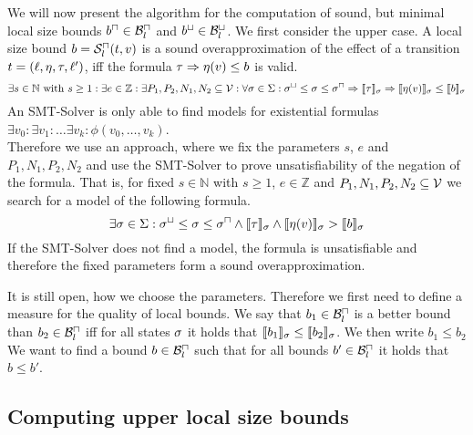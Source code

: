 We will now present the algorithm for the computation of sound, but minimal local size bounds $b^\sqcap \in \mathcal{B}^\sqcap_l$ and $b^\sqcup \in \mathcal{B}^\sqcup_l$.
We first consider the upper case.
A local size bound $b = {\mathcal{S}^\sqcap_l}(t,v)$ is a sound overapproximation of the effect of a transition $t = (\ell,\eta,\tau,\ell')$, iff the formula $\tau \Rightarrow \eta(v) \leq b$ is valid.
\[ \exists s \in \mathbb{N} \text{ with } s \geq 1:
\exists e \in \mathbb{Z}:
\exists P_1, P_2, N_1, N_2 \subseteq \mathcal{V}:
\forall \sigma \in \Sigma:
{\sigma^\sqcup} \leq \sigma \leq {\sigma^\sqcap} \Rightarrow
\llbracket \tau \rrbracket_{\sigma} \Rightarrow \llbracket \eta(v) \rrbracket_{\sigma} \leq \llbracket b \rrbracket_{\sigma} \]
An SMT-Solver is only able to find models for existential formulas $\exists v_0: \exists v_1: \dots \exists v_k: \phi(v_0, \dots, v_k)$. \cite{smt} \\
Therefore we use an approach, where we fix the parameters $s$, $e$ and $P_1, N_1, P_2, N_2$ and use the SMT-Solver to prove unsatisfiability of the negation of the formula.
That is, for fixed $s \in \mathbb{N}$ with $s \geq 1$, $e \in \mathbb{Z}$ and $P_1, N_1, P_2, N_2 \subseteq \mathcal{V}$ we search for a model of the following formula.
\[ \exists \sigma \in \Sigma: {\sigma^\sqcup} \leq \sigma \leq {\sigma^\sqcap} \wedge \llbracket \tau \rrbracket_{\sigma} \wedge \llbracket \eta(v) \rrbracket_{\sigma} > \llbracket b \rrbracket_{\sigma} \]
If the SMT-Solver does not find a model, the formula is unsatisfiable and therefore the fixed parameters form a sound overapproximation.

It is still open, how we choose the parameters.
Therefore we first need to define a measure for the quality of local bounds.
We say that $b_1 \in \mathcal{B}^\sqcap_l$ is a better bound than $b_2 \in \mathcal{B}^\sqcap_l$ iff for all states $\sigma$ it holds that $\llbracket b_1 \rrbracket_{\sigma} \leq \llbracket b_2 \rrbracket_{\sigma}$.
We then write $b_1 \leq b_2$
We want to find a bound $b \in \mathcal{B}^\sqcap_l$ such that for all bounds $b' \in \mathcal{B}^\sqcap_l$ it holds that $b \leq b'$.

\subsection{Computing upper local size bounds}

